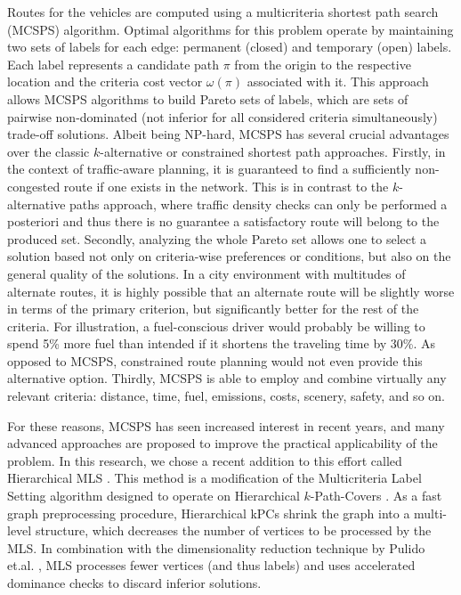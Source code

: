 \documentclass[sigconf]{aamas}
\begin{document}
Routes for the vehicles are computed using a multicriteria shortest path search (MCSPS) algorithm. Optimal algorithms for this problem operate by maintaining two sets of labels for each edge: permanent (closed) and temporary (open) labels. Each label represents a candidate path $\pi$ from the origin to the respective location and the criteria cost vector $\omega{(\pi)}$ associated with it. This approach allows MCSPS algorithms to build Pareto sets of labels, which are sets of pairwise non-dominated (not inferior for all considered criteria simultaneously) trade-off solutions. Albeit being NP-hard, MCSPS has several crucial advantages over the classic $k$-alternative or constrained shortest path approaches. Firstly, in the context of traffic-aware planning, it is guaranteed to find a sufficiently non-congested route if one exists in the network. This is in contrast to the $k$-alternative paths approach, where traffic density checks can only be performed a posteriori and thus there is no guarantee a satisfactory route will belong to the produced set. Secondly, analyzing the whole Pareto set allows one to select a solution based not only on criteria-wise preferences or conditions, but also on the general quality of the solutions. In a city environment with multitudes of alternate routes, it is highly possible that an alternate route will be slightly worse in terms of the primary criterion, but significantly better for the rest of the criteria. For illustration, a fuel-conscious driver would probably be willing to spend 5\% more fuel than intended if it shortens the traveling time by 30\%. As opposed to MCSPS, constrained route planning would not even provide this alternative option. Thirdly, MCSPS is able to employ and combine virtually any relevant criteria: distance, time, fuel, emissions, costs, scenery, safety, and so on. 

For these reasons, MCSPS has seen increased interest in recent years, and many advanced approaches are proposed to improve the practical applicability of the problem. In this research, we chose a recent addition to this effort called Hierarchical MLS \cite{HierMLS}. This method is a modification of the Multicriteria Label Setting algorithm \cite{Martins} designed to operate on Hierarchical $k$-Path-Covers \cite{HierKPC}. As a fast graph preprocessing procedure, Hierarchical kPCs shrink the graph into a multi-level structure, which decreases the number of vertices to be processed by the MLS. In combination with the dimensionality reduction technique by Pulido et.al. \cite{dimensionality}, MLS processes fewer vertices (and thus labels) and uses accelerated dominance checks to discard inferior solutions.  
\end{document}
